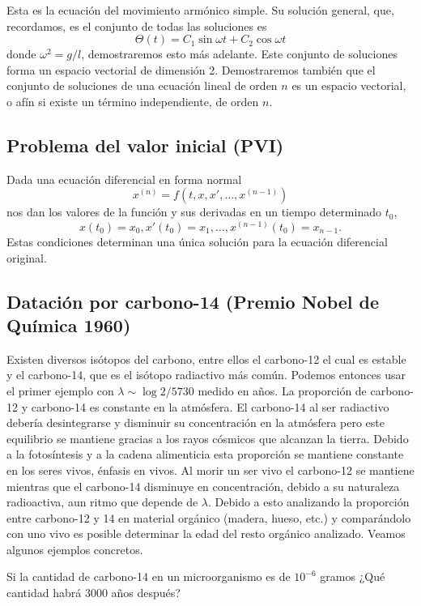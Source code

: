 \documentclass[../main.tex]{subfiles}
\begin{document}
Esta es la ecuación del movimiento armónico simple. Su solución general, que,
recordamos, es el conjunto de todas las soluciones es
\[\Theta(t) = C_1 \sin \omega t + C_2 \cos \omega t\]
donde \(\omega^2 = g/l\), demostraremos esto más adelante. Este conjunto de
soluciones forma un espacio vectorial de dimensión 2. Demostraremos también que
el conjunto de soluciones de una ecuación lineal de orden \(n\) es un espacio
vectorial, o afín si existe un término independiente, de orden \(n\).

\subsection{Problema del valor inicial (PVI)}

Dada una ecuación diferencial en forma normal
\[x^{(n)} = f(t, x, x', \dots, x^{(n - 1)})\]
nos dan los valores de la función y sus derivadas en un tiempo determinado
\(t_0\),
\[x(t_0) = x_0, x'(t_0) = x_1, \dots, x^{(n - 1)}(t_0) = x_{n - 1}.\]
Estas condiciones determinan una única solución para la ecuación diferencial
original.

\subsection{Datación por carbono-14 (Premio Nobel de Química 1960)}

Existen diversos isótopos del carbono, entre ellos el carbono-12 el cual es
estable y el carbono-14, que es el isótopo radiactivo más común. Podemos
entonces usar el primer ejemplo con \(\lambda \sim \log 2 / 5730\) medido en
años. La proporción de carbono-12 y carbono-14 es constante en la atmósfera. El
carbono-14 al ser radiactivo debería desintegrarse y disminuir su concentración
en la atmósfera pero este equilibrio se mantiene gracias a los rayos cósmicos
que alcanzan la tierra. Debido a la fotosíntesis y a la cadena alimenticia esta
proporción se mantiene constante en los seres vivos, énfasis en vivos. Al morir
un ser vivo el carbono-12 se mantiene mientras que el carbono-14 disminuye en
concentración, debido a su naturaleza radioactiva, aun ritmo que depende de
\(\lambda\). Debido a esto analizando la proporción entre carbono-12 y 14 en
material orgánico (madera, hueso, etc.) y comparándolo con uno vivo es posible
determinar la edad del resto orgánico analizado. Veamos algunos ejemplos
concretos.

\begin{example}
	Si la cantidad de carbono-14 en un microorganismo es de \(10^{-6}\) gramos
	¿Qué cantidad habrá 3000 años después?
\end{example}
\end{document}
